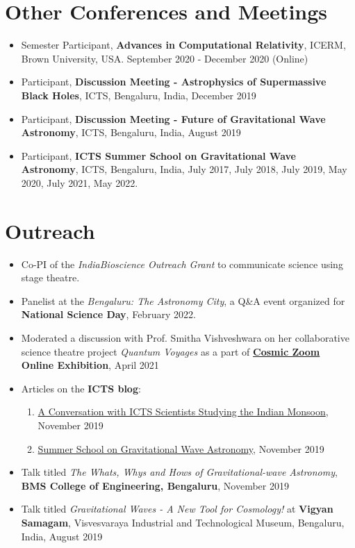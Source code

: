 \documentclass[11pt, margin, centered, letterpaper]{res}
\begin{document}
\begin{resume}
		\section{Other Conferences and Meetings}
		\begin{itemize}[leftmargin=*]
			\item Semester Participant, \textbf{Advances in Computational Relativity}, ICERM, Brown University, USA. September 2020 - December 2020 (Online)
			\item	Participant, \textbf{Discussion Meeting - Astrophysics of Supermassive Black Holes}, ICTS, Bengaluru, India, December 2019
			\item Participant, \textbf{Discussion Meeting - Future of Gravitational Wave Astronomy}, ICTS, Bengaluru, India, August 2019
			\item Participant, \textbf{ICTS Summer School on Gravitational Wave Astronomy}, ICTS, Bengaluru, India, July 2017, July 2018, July 2019, May 2020, July 2021, May 2022.
			
		\end{itemize}
		\section{Outreach}
		\begin{itemize}[leftmargin=*]
			\item Co-PI of the \textit{IndiaBioscience Outreach Grant} to communicate science using stage theatre.
			\item Panelist at the \textit{Bengaluru: The Astronomy City}, a Q\&A event organized for \textbf{National Science Day}, February 2022.
			\item Moderated a discussion with Prof. Smitha Vishveshwara on her collaborative science theatre project \textit{Quantum Voyages} as a part of \textbf{\href{https://cosmic-zoom.in/}{Cosmic Zoom} Online Exhibition}, April 2021
			\item Articles on the \textbf{ICTS blog}:
			\begin{enumerate}
				\item \href{https://blog.icts.res.in/blog/conversation-icts-scientists-studying-indian-monsoon}{A Conversation with ICTS Scientists Studying the Indian Monsoon}, November 2019
				\item \href{https://blog.icts.res.in/blog/summer-school-gravitational-wave-astronomy}{Summer School on Gravitational Wave Astronomy}, November 2019
			\end{enumerate}	
			\item Talk titled \textit{The Whats, Whys and Hows of Gravitational-wave Astronomy}, \textbf{BMS College of Engineering, Bengaluru}, November 2019
			\item Talk titled \textit{Gravitational Waves - A New Tool for Cosmology!} at \textbf{Vigyan Samagam}, Visvesvaraya Industrial and Technological Museum, Bengaluru, India, August 2019
			

\end{itemize}
\end{resume}
\end{document}
